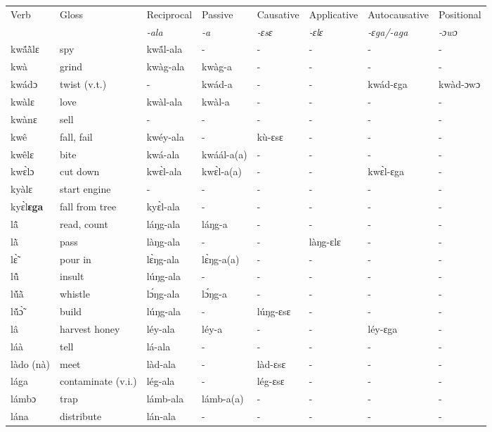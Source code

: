 \begin{sidewaystable}
\begin{tabular}{llllllll}
 \lsptoprule
 Verb & Gloss & Reciprocal & Passive  & Causative  & Applicative   & Autocausative & Positional   \\
  &    & {\itshape -ala} & {\itshape -a} & {\itshape -ɛsɛ} & {\itshape -ɛlɛ} & {\itshape -ɛga/-aga}  & {\itshape -ɔwɔ}  \\
\midrule
kwã́ã̀lɛ & spy & kwã́l-ala  & - & - & - & - & - \\
kwà & grind & kwàg-ala & kwàg-a & - & - & - & - \\
kwádɔ & twist (v.t.) & - &  kwád-a & - & - & kwád-ɛga & kwàd-ɔwɔ \\
kwàlɛ & love & kwàl-ala & kwàl-a & - & - & - & - \\
kwànɛ & sell & - & - & - & - & - & - \\
kwê & fall, fail & kwéy-ala & - & kù-ɛsɛ & - & - & - \\
kwêlɛ & bite & kwá-ala & kwáál-a(a) & - & -  & - & - \\
 kwɛ̀lɔ & cut down & kwɛ̀l-ala & kwɛ̀l-a(a) & - & - & kwɛ̀l-ɛga & - \\
kyàlɛ & start engine & - & - & - & - & - & - \\
kyɛ̀l{\bfseries ɛga} & fall from tree & kyɛ̀l-ala & - & - & - & - & - \\
lã̂ & read, count & láŋg-ala & láŋg-a & - & - & - & - \\
lã̀ & pass & làŋg-ala & - & - &  làŋg-ɛlɛ  & - & - \\
lɛ̃̀ & pour in & lɛ̀ŋg-ala & lɛ̀ŋg-a(a)  & - & - & - & - \\
lũ̂ & insult & lúŋg-ala & - & - &  - & - & - \\
lṹã̀ & whistle & lɔ́ŋg-ala & lɔ́ŋg-a & - & - & - & - \\
lṹɔ̃̀ & build & lúŋg-ala & - & lúŋg-ɛsɛ & - & - & - \\
lâ & harvest honey & léy-ala & léy-a & - & - &  léy-ɛga & - \\
láà & tell & lá-ala & - & -  & - & - & - \\
làdo (nà) & meet & làd-ala & - & làd-ɛsɛ & - & - & - \\
lága & contaminate (v.i.) & lég-ala & - & lég-ɛsɛ & - & - & - \\
lámbɔ & trap & lámb-ala & lámb-a(a) & - & - & - & - \\
lána & distribute & lán-ala & - & - & - & - & - \\
\midrule\end{tabular}\end{sidewaystable}

